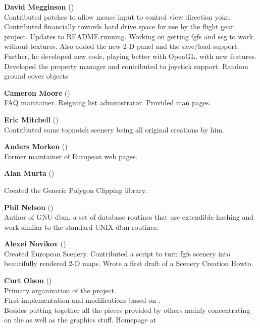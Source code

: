 \noindent \textbf{David Megginson} ()\\
  Contributed patches to allow mouse input to control view direction yoke.
  Contributed financially towards hard drive space for use by the
  flight gear project. Updates to README.running.
  Working on getting fgfs and ssg to work without textures.
  Also added the new 2-D panel and the save/load support.
  Further, he developed new  code, playing better with OpenGL, with new features.
  Developed the property manager and contributed to joystick support.
  Random ground cover objects
 \medskip

 \medskip

\noindent \textbf{Cameron Moore}
()\\
 FAQ maintainer. Reigning list administrator. Provided man pages.
 \medskip

\noindent \textbf{Eric Mitchell} ()\\
  Contributed some topnotch scenery  being all original creations by him.
 \medskip

\noindent \textbf{Anders Morken} ()\\
  Former maintainer of European web pages.
  \medskip

\noindent \textbf{Alan Murta} ()
 \medskip

  Created the Generic Polygon Clipping library.
 \medskip

   \medskip

\noindent \textbf{Phil Nelson} ()\\
  Author of GNU dbm, a set of database routines that use extendible hashing and work
  similar to the standard UNIX dbm routines.
  \medskip

\noindent \textbf{Alexei Novikov}
()\\
  Created European Scenery. Contributed a script to turn fgfs scenery into beautifully rendered
  2-D maps. Wrote a first draft of a Scenery Creation Howto.
  \medskip

\noindent \textbf{Curt Olson} ()\\
 Primary organization of the project.\\
 First implementation and modifications based on .\\
 Besides putting together all the pieces provided by others mainly concentrating on the  as well as the graphics stuff. Homepage at

